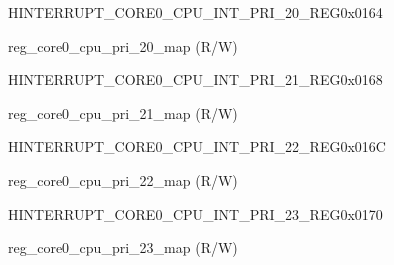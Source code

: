 \begin{register}{H}{INTERRUPT\_CORE0\_CPU\_INT\_PRI\_20\_REG}{0x0164}\label{regdesc:INTERRUPTCORE0CPUINTPRI20REG}
%
%
\regnewline%
\begin{regdesc}\begin{reglist}
\label{fielddesc:INTERRUPTCORE0CPUPRI20MAP}\item [INTERRUPT\_CORE0\_CPU\_PRI\_20\_MAP] reg\_core0\_cpu\_pri\_20\_map (R/W)
\end{reglist}\end{regdesc}
\end{register}


\begin{register}{H}{INTERRUPT\_CORE0\_CPU\_INT\_PRI\_21\_REG}{0x0168}\label{regdesc:INTERRUPTCORE0CPUINTPRI21REG}
%
%
\regnewline%
\begin{regdesc}\begin{reglist}
\label{fielddesc:INTERRUPTCORE0CPUPRI21MAP}\item [INTERRUPT\_CORE0\_CPU\_PRI\_21\_MAP] reg\_core0\_cpu\_pri\_21\_map (R/W)
\end{reglist}\end{regdesc}
\end{register}


\begin{register}{H}{INTERRUPT\_CORE0\_CPU\_INT\_PRI\_22\_REG}{0x016C}\label{regdesc:INTERRUPTCORE0CPUINTPRI22REG}
%
%
\regnewline%
\begin{regdesc}\begin{reglist}
\label{fielddesc:INTERRUPTCORE0CPUPRI22MAP}\item [INTERRUPT\_CORE0\_CPU\_PRI\_22\_MAP] reg\_core0\_cpu\_pri\_22\_map (R/W)
\end{reglist}\end{regdesc}
\end{register}


\begin{register}{H}{INTERRUPT\_CORE0\_CPU\_INT\_PRI\_23\_REG}{0x0170}\label{regdesc:INTERRUPTCORE0CPUINTPRI23REG}
%
%
\regnewline%
\begin{regdesc}\begin{reglist}
\label{fielddesc:INTERRUPTCORE0CPUPRI23MAP}\item [INTERRUPT\_CORE0\_CPU\_PRI\_23\_MAP] reg\_core0\_cpu\_pri\_23\_map (R/W)
\end{reglist}\end{regdesc}
\end{register}


